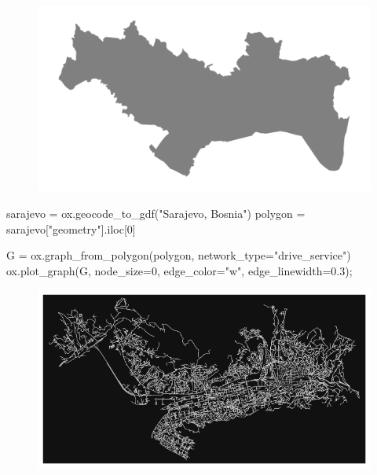 \documentclass[
  letterpaper,
  DIV=11,
  numbers=noendperiod]{scrreprt}
\newenvironment{Shaded}{\begin{snugshade}}{\end{snugshade}}
\newcommand{\DecValTok}[1]{\textcolor[rgb]{0.68,0.00,0.00}{#1}}
\newcommand{\FloatTok}[1]{\textcolor[rgb]{0.68,0.00,0.00}{#1}}
\newcommand{\NormalTok}[1]{\textcolor[rgb]{0.00,0.23,0.31}{#1}}
\newcommand{\OperatorTok}[1]{\textcolor[rgb]{0.37,0.37,0.37}{#1}}
\newcommand{\StringTok}[1]{\textcolor[rgb]{0.13,0.47,0.30}{#1}}
\begin{document}
\begin{figure}[H]

{\centering \includegraphics{labs/w07_OSM_files/figure-pdf/cell-13-output-1.png}

}

\end{figure}

\begin{Shaded}
\begin{Highlighting}[]
\NormalTok{sarajevo }\OperatorTok{=}\NormalTok{ ox.geocode\_to\_gdf(}\StringTok{"Sarajevo, Bosnia"}\NormalTok{)}
\NormalTok{polygon }\OperatorTok{=}\NormalTok{ sarajevo[}\StringTok{"geometry"}\NormalTok{].iloc[}\DecValTok{0}\NormalTok{]}

\NormalTok{G }\OperatorTok{=}\NormalTok{ ox.graph\_from\_polygon(polygon, network\_type}\OperatorTok{=}\StringTok{"drive\_service"}\NormalTok{)}
\NormalTok{ox.plot\_graph(G, node\_size}\OperatorTok{=}\DecValTok{0}\NormalTok{, edge\_color}\OperatorTok{=}\StringTok{"w"}\NormalTok{, edge\_linewidth}\OperatorTok{=}\FloatTok{0.3}\NormalTok{)}\OperatorTok{;}
\end{Highlighting}
\end{Shaded}

\begin{figure}[H]

{\centering \includegraphics{labs/w07_OSM_files/figure-pdf/cell-14-output-1.png}

}

\end{figure}
\end{document}
